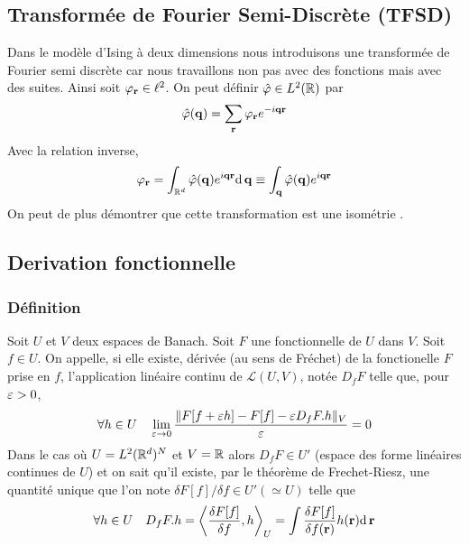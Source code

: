 \documentclass[10pt]{article}
\begin{document}
\begin{multicols}{2}
\vspace*{11pt}



\subsection{Transformée de Fourier Semi-Discrète (TFSD)}

\label{ann:TFSD}

Dans le modèle d'Ising à deux dimensions nous introduisons une transformée de Fourier semi discrète car nous travaillons non pas avec des fonctions mais avec des suites. Ainsi soit $\varphi_{\bf r} \in \ell^2$. On peut définir $\hat{\varphi} \in L^2(\mathbb{R})$ par  
\begin{equation}
  \hat{\varphi}({\bf q}) = \sum_{\bf r} \varphi_{\bf r} e^{-i{\bf q}{\bf r}}
\end{equation}
  Avec la relation inverse,
\begin{equation}
 \varphi_{\bf r} = \int_{\mathbb{R}^d} \hat{\varphi}({\bf q})  e^{i{\bf q}{\bf r}} \text{d}\, {\bf q} \equiv \int_{\bf q} \hat{\varphi}({\bf q})  e^{i{\bf q}{\bf r}}
\end{equation}
On peut de plus démontrer que cette transformation est une isométrie \cite{}.



\vspace*{11pt}
\subsection{Derivation fonctionnelle}

\subsubsection{Définition}
Soit $U$ et $V$ deux espaces de Banach. Soit $F$ une fonctionnelle de $U$ dans $V$. 
Soit $f \in U$. On appelle, si elle existe, dérivée (au sens de Fréchet) de la fonctionelle $F$ prise en $f$, l'application linéaire continu de $\mathcal{L}(U,V)$, notée $D_fF$ telle que, pour $\varepsilon>0$, 
\begin{equation}
\forall h \in U \quad \lim_{ \varepsilon \rightarrow 0 } \frac{\| F[f+\varepsilon h] - F[f] - \varepsilon D_fF.h\|_V}{\varepsilon}  = 0
\end{equation} 
Dans le cas où $U = L^2(\mathbb{R}^d)^N$ et $V = \mathbb{R}$ alors $D_fF \in U'$ (espace des forme linéaires continues de $U$) et on sait qu'il existe, par le théorème de Frechet-Riesz, une quantité unique que l'on note $\delta F[f]/\delta f \in U'(\simeq U)$ telle que 
\begin{equation}
\forall h \in U \quad D_f F.h = {\left< \frac{\delta F[f]}{\delta f}, h \right>}_{U} = \int \frac{\delta F[f]}{\delta f({\bf r})} h({\bf r}) \text{d} \, {\bf r}	
\end{equation}


\end{multicols}
\end{document}
